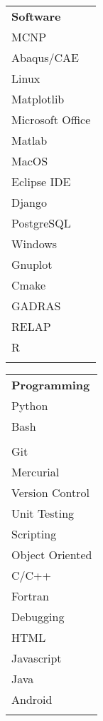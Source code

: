\begin{minipage}{0.2\textwidth}
	\begin{center}
\begin{tabular}{l}
	{\large\textbf{Software}} \\
	\highskillbw \textsc{MCNP} \\
	\highskillbw Abaqus/CAE \\
	\highskillbw Linux \\ 
	\highskillbw Matplotlib \\ 
	\highskillbw Microsoft Office \\
	\highskillbw Matlab \\
	\highskillbw MacOS \\
	\medskillbw Eclipse IDE \\
	\medskillbw Django  \\
	\medskillbw PostgreSQL \\
	\medskillbw Windows \\
	\medskillbw Gnuplot \\
	\lowskillbw Cmake \\
	\lowskillbw GADRAS \\
	\lowskillbw RELAP \\
	\lowskillbw R \\
	\\
\end{tabular}
	\end{center}
\end{minipage}%
\begin{minipage}{0.23\textwidth}
	\begin{center}
\begin{tabular}{l}
	{\large\textbf{Programming}} \\
	\highskillbw Python \\
	\highskillbw Bash \\ 
	\highskillbw {\fontfamily{ptm}\selectfont \LaTeX} \\ 
	\highskillbw Git \\
	\highskillbw Mercurial \\
	\highskillbw Version Control \\
	\highskillbw Unit Testing \\
	\highskillbw Scripting \\ 
	\medskillbw Object Oriented \\
	\medskillbw C/C++ \\
	\medskillbw Fortran \\
	\medskillbw Debugging \\
	\lowskillbw HTML \\
	\lowskillbw Javascript \\
	\lowskillbw Java \\
	\lowskillbw Android \\
	\\
\end{tabular}
	\end{center}
\end{minipage}%
